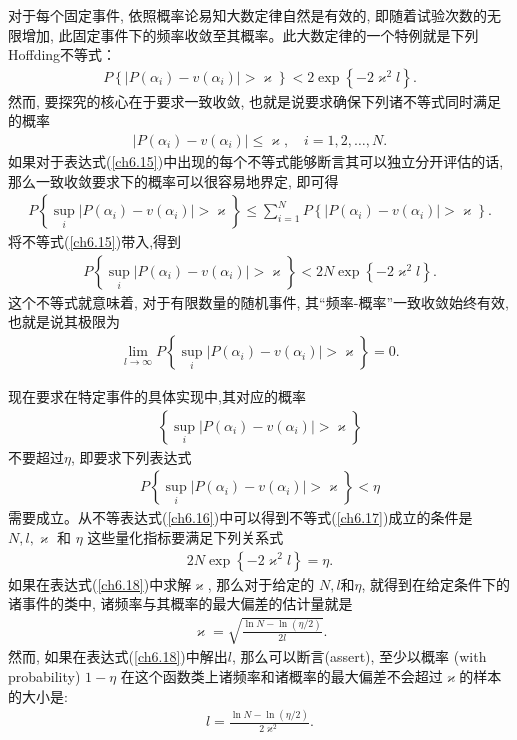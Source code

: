 对于每个固定事件, 依照概率论易知大数定律自然是有效的, 即随着试验次数的无限增加, 此固定事件下的频率收敛至其概率。此大数定律的一个特例就是下列Hoffding不等式：
\begin{align}\label{ch6.15}
P\left\{\left|P\left(\alpha_{i}\right)-v\left(\alpha_{i}\right)\right|>\varkappa\right\}<2 \exp \left\{-2 \varkappa^{2} l\right\}.
\end{align}
然而, 要探究的核心在于要求一致收敛, 也就是说要求确保下列诸不等式同时满足的概率
\begin{align}
\left|P\left(\alpha_{i}\right)-v\left(\alpha_{i}\right)\right| \leq \varkappa, \quad i=1,2, \ldots, N.
\end{align}
如果对于表达式(\ref{ch6.15})中出现的每个不等式能够断言其可以独立分开评估的话, 那么一致收敛要求下的概率可以很容易地界定, 即可得
\begin{align}
P\left\{\sup _{i}\left|P\left(\alpha_{i}\right)-v\left(\alpha_{i}\right)\right|>\varkappa\right\} \leq \sum_{i=1}^{N} P\left\{\left|P\left(\alpha_{i}\right)-v\left(\alpha_{i}\right)\right|>\varkappa\right\}.
\end{align}
将不等式(\ref{ch6.15})带入,得到
\begin{align}\label{ch6.16}
P\left\{\sup _{i}\left|P\left(\alpha_{i}\right)-v\left(\alpha_{i}\right)\right|> \varkappa\right\}<2 N \exp \left\{-2 \varkappa^{2} l\right\}.
\end{align}
这个不等式就意味着, 对于有限数量的随机事件, 其“频率-概率”一致收敛始终有效, 也就是说其极限为
\begin{align}
\lim _{l \rightarrow \infty} P\left\{\sup _{i}\left|P\left(\alpha_{i}\right)-v\left(\alpha_{i}\right)\right|>\varkappa\right\}=0.
\end{align}

现在要求在特定事件的具体实现中,其对应的概率
\begin{align}
\left\{\sup _{i}\left|P\left(\alpha_{i}\right)-v\left(\alpha_{i}\right)\right|>\varkappa\right\}
\end{align}
不要超过$\eta$, 即要求下列表达式
\begin{align}\label{ch6.17}
P\left\{\sup _{i}\left|P\left(\alpha_{i}\right)-v\left(\alpha_{i}\right)\right|>\varkappa\right\}<\eta
\end{align}
需要成立。从不等表达式(\ref{ch6.16})中可以得到不等式(\ref{ch6.17})成立的条件是$N, l, \varkappa$ 和 $\eta$ 这些量化指标要满足下列关系式
\begin{align}\label{ch6.18}
2 N \exp \left\{-2 \varkappa^{2} l\right\}=\eta.
\end{align}
如果在表达式(\ref{ch6.18})中求解$\varkappa$, 那么对于给定的 $N, l$和$\eta$, 就得到在给定条件下的诸事件的类中, 诸频率与其概率的最大偏差的估计量就是
\begin{align}\label{ch6.19}
\varkappa=\sqrt{\frac{\ln N-\ln (\eta / 2)}{2 l}}.
\end{align}
然而, 如果在表达式(\ref{ch6.18})中解出$l$, 那么可以断言(assert), 至少以概率 (with probability) $1-\eta$ 在这个函数类上诸频率和诸概率的最大偏差不会超过$\varkappa$的样本的大小是:
\begin{align}\label{ch6.20}
l=\frac{\ln N-\ln (\eta / 2)}{2 \varkappa^{2}}.
\end{align}

